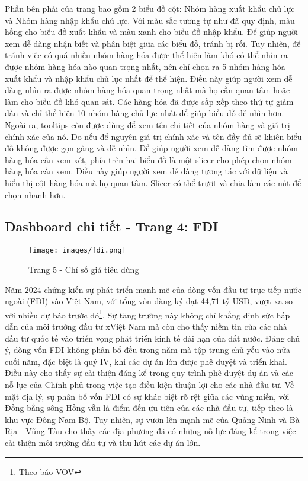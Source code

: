 \documentclass[a4paper]{report}
\begin{document}
{{Phần bên phải của trang bao gồm 2 biểu đồ cột: Nhóm hàng xuất khẩu chủ lực và Nhóm hàng nhập khẩu chủ lực. Với màu sắc tương tự như đã quy định, màu hồng cho biểu đồ xuất khẩu và màu xanh cho biểu đồ nhập khẩu. Để giúp người xem dễ dàng nhận biết và phân biệt giữa các biểu đồ, tránh bị rối.
Tuy nhiên, để tránh việc có quá nhiều nhóm hàng hóa được thể hiện làm khó có thể nhìn ra được nhóm hàng hóa nào quan trọng nhất, nên chỉ chọn ra 5 nhóm hàng hóa xuất khẩu và nhập khẩu chủ lực nhất để thể hiện. Điều này giúp người xem dễ dàng nhìn ra được nhóm hàng hóa quan trọng nhất mà họ cần quan tâm hoặc làm cho biểu đồ khó quan sát. Các hàng hóa đã được sắp xếp
theo thứ tự giảm dần và chỉ thể hiện 10 nhóm hàng chủ lực nhất để giúp biểu đồ dễ nhìn hơn. Ngoài ra, tooltips còn được dùng để xem tên chi tiết của nhóm hàng và giá trị chính xác của nó. Do nếu để nguyên giá trị chính xác và tên đầy đủ sẽ khiên biểu đồ không được gọn gàng và dễ nhìn.
Để giúp người xem dễ dàng tìm được nhóm hàng hóa cần xem xét, phía trên hai biểu đồ là một slicer cho phép chọn nhóm hàng hóa cần xem. Điều này giúp người xem dễ dàng tương tác với dữ liệu và hiển thị cột hàng hóa mà họ quan tâm. Slicer có thể trượt và chia làm các nút để chọn nhanh hơn.\\


\subsection{Dashboard chi tiết - Trang 4: FDI}
\begin{figure}[H]
    \centering
    \texttt{[image: images/fdi.png]}
    \caption{Trang 5 - Chỉ số giá tiêu dùng}
    \label{fig:enter-label}
\end{figure}

Năm 2024 chứng kiến sự phát triển mạnh mẽ của dòng vốn đầu tư trực tiếp nước ngoài (FDI) vào Việt Nam, với tổng vốn đăng ký đạt 44,71 tỷ USD, vượt xa so với nhiều dự báo trước đó\footnote{\href{https://vov.vn/kinh-te/3138-ty-usd-von-fdi-rot-vao-viet-nam-trong-11-thang-post1140227.vov}{Theo báo VOV}}.
Sự tăng trưởng này không chỉ khẳng định sức hấp dẫn của môi trường đầu tư xViệt Nam mà còn cho thấy niềm tin của các nhà đầu tư quốc tế vào triển vọng phát triển kinh tế dài hạn của đất nước. Đáng chú ý, dòng vốn FDI không phân bổ đều trong năm mà tập trung chủ yếu vào nửa cuối năm, đặc biệt là quý IV, khi các dự án lớn được phê duyệt và triển khai. Điều này cho thấy sự cải thiện đáng kể trong quy trình phê duyệt dự án và các nỗ lực của Chính phủ trong việc tạo điều kiện thuận lợi cho các nhà đầu tư. Về mặt địa lý, sự phân bổ vốn FDI có sự khác biệt rõ rệt giữa các vùng miền, với Đồng bằng sông Hồng vẫn là điểm đến ưu tiên của các nhà đầu tư, tiếp theo là khu vực Đông Nam Bộ. Tuy nhiên, sự vươn lên mạnh mẽ của Quảng Ninh và Bà Rịa - Vũng Tàu cho thấy các địa phương đã có những nỗ lực đáng kể trong việc cải thiện môi trường đầu tư và thu hút các dự án lớn.\\

}}
\end{document}

